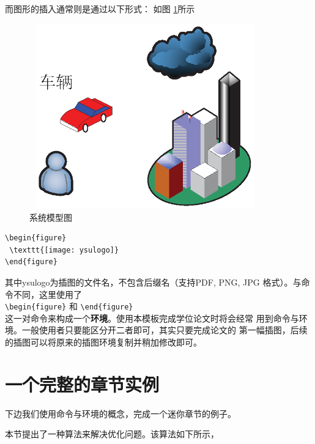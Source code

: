 而图形的插入通常则是通过以下形式：
如图 \ref{系统模型图}所示
\begin{figure}[H]
\centering
\includegraphics[width=10cm,height=8cm]{figures//chap1//系统模型图.eps}
\caption{系统模型图}
\label{系统模型图}
\end{figure}

\begin{verbatim}
\begin{figure}
 \texttt{[image: ysulogo]}
\end{figure}
\end{verbatim}
其中ysulogo为插图的文件名，不包含后缀名（\XeLaTeX 支持PDF, PNG, JPG 格式）。与命令不同，这里使用了\\
\verb|\begin{figure}|
和
\verb|\end{figure}|\\
这一对命令来构成一个\textbf{环境}。使用本模板完成学位论文时将会经常
用到命令与环境。一般使用者只要能区分开二者即可，其实只要完成论文的
第一幅插图，后续的插图可以将原来的插图环境复制并稍加修改即可。

\section{一个完整的章节实例}\label{section1-2}
下边我们使用命令与环境的概念，完成一个迷你章节的例子。

本节提出了一种算法来解决优化问题。该算法如下所示，

